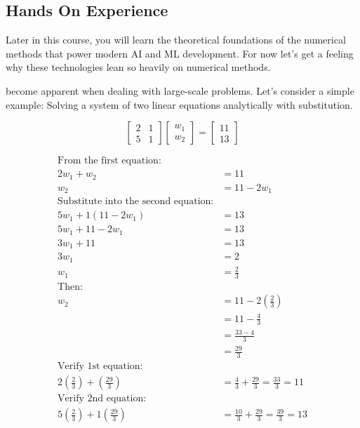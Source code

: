 

\newpage
\subsection{Hands On Experience}  
Later in this course, you will learn the theoretical foundations of the numerical methods that power modern AI and ML development. 
For now let's get a feeling why these technologies lean so heavily on numerical methods.

 become apparent when dealing with large-scale problems.
Let's consider a simple example: Solving a system of two linear equations analytically with substitution.

\begin{equation}
    \begin{bmatrix}2 & 1 \\ 5 & 1\end{bmatrix} \begin{bmatrix}w_1 \\ w_2\end{bmatrix} = \begin{bmatrix}11 \\ 13\end{bmatrix}
\end{equation}
\label{eq:linearequation}


\begin{align*}
    \text{From the first equation:} \\
    2w_1 + w_2 &= 11 \\
    w_2 &= 11 - 2w_1 \\
    \text{Substitute into the second equation:} \\
    5w_1 + 1(11 - 2w_1) &= 13 \\
    5w_1 + 11 - 2w_1 &= 13 \\
    3w_1 + 11 &= 13 \\
    3w_1 &= 2 \\
    w_1 &= \frac{2}{3} \\
    \text{Then:} \\
    w_2 &= 11 - 2\left(\frac{2}{3}\right) \\
    &= 11 - \frac{4}{3} \\
    &= \frac{33 - 4}{3} \\
    &= \frac{29}{3} \\
    \text{Verify 1st equation:} \\
    2\left(\frac{2}{3}\right) + \left(\frac{29}{3}\right) &= \frac{4}{3} + \frac{29}{3} = \frac{33}{3} = 11 \\
    \text{Verify 2nd equation:} \\
    5\left(\frac{2}{3}\right) + 1\left(\frac{29}{3}\right) &= \frac{10}{3} + \frac{29}{3} = \frac{39}{3} = 13
\end{align*}


